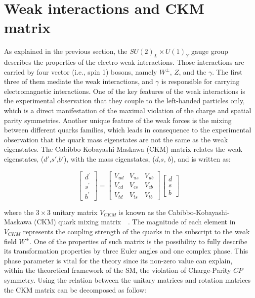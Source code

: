 \section{Weak interactions and CKM matrix}

As explained in the previous section, the $ SU(2)_L \times U(1)_Y$ gauge group describes the properties of the electro-weak interactions. Those interactions are carried by four vector (i.e., spin 1) bosons, namely $W^{\pm}$, $Z$, and the $\gamma$.  The first three of them mediate the weak interactions, and $\gamma$ is responsible for carrying electromagnetic interactions. One of the key features of the weak interactions is the experimental observation that they couple to the left-handed particles only, which is a direct manifestation of the maximal violation of the charge and spatial parity symmetries. Another unique feature of the weak forces is the mixing between different quarks families, which leads in consequence to the experimental observation that the quark mass eigenstates are not the same as the weak eigenstates. The Cabibbo-Kobayashi-Maskawa (CKM) matrix relates the weak eigenstates,  ($d\prime$,$s\prime$,$b\prime$), with the mass eigenstates, ($d$,$s$, $b$), and is written as:

\begin{equation}
\label{eq:ckm}
  \begin{bmatrix}  d^\prime  \\  s^\prime  \\  b^\prime  \end{bmatrix} = \begin{bmatrix} V_{ud} & V_{us} & V_{ub} \\ V_{cd} & V_{cs} & V_{cb} \\ V_{td} & V_{ts} & V_{tb} \end{bmatrix} \begin{bmatrix}  d  \\  s  \\  b  \end{bmatrix}
\end{equation}

where the $3 \times 3$ unitary matrix $V_{CKM}$ is known as the Cabibbo-Kobayashi-Maskawa (CKM) quark mixing matrix~\cite{ckm1}~\cite{ckm2}. The magnitude of each element in $V_{CKM}$ represents the coupling strength of the quarks in the subscript to the weak field $W^{\pm}$.  One of the properties of such matrix is the possibility to fully describe its transformation properties by three Euler angles and one complex phase. This phase parameter is vital for the theory since its non-zero value can explain, within the theoretical framework of the SM, the violation of Charge-Parity $CP$ symmetry. Using the relation between the unitary matrices and rotation matrices the CKM matrix can be decomposed as follow:

